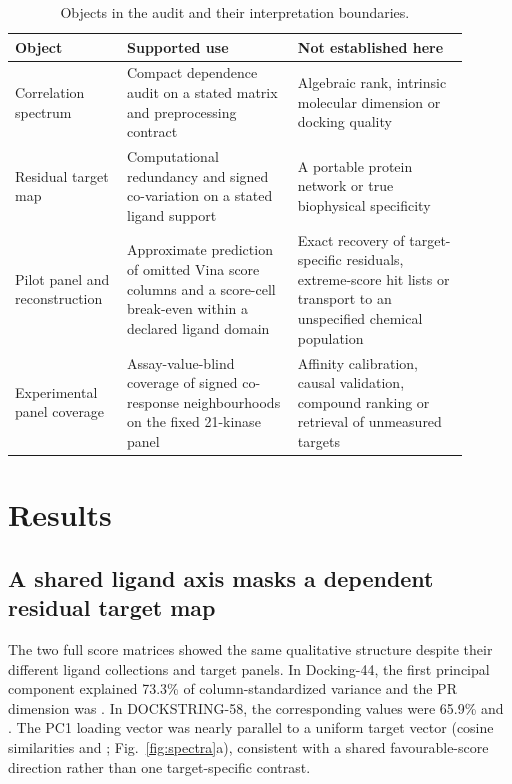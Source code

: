 \documentclass[11pt]{article}
\begin{document}
\begin{table}[htbp]
\centering
\caption{Objects in the audit and their interpretation boundaries.}
\label{tab:scope}
\small
\begin{tabular}{p{0.22\linewidth}p{0.34\linewidth}p{0.34\linewidth}}
\toprule
Object & Supported use & Not established here \\
\midrule
Correlation spectrum & Compact dependence audit on a stated matrix and
preprocessing contract & Algebraic rank, intrinsic molecular dimension or
docking quality \\
Residual target map & Computational redundancy and signed co-variation on a
stated ligand support & A portable protein network or true biophysical
specificity \\
Pilot panel and reconstruction & Approximate prediction of omitted Vina score
columns and a score-cell break-even within a declared ligand domain & Exact
recovery of target-specific residuals, extreme-score hit lists or transport to
an unspecified chemical population \\
Experimental panel coverage & Assay-value-blind coverage of signed co-response
neighbourhoods on the fixed 21-kinase panel & Affinity calibration, causal
validation, compound ranking or retrieval of unmeasured targets \\
\bottomrule
\end{tabular}
\end{table}



\section{Results}

\subsection{A shared ligand axis masks a dependent residual target map}

The two full score matrices showed the same qualitative structure despite their
different ligand collections and target panels. In Docking-44, the first
principal component explained 73.3\% of column-standardized variance and the PR
dimension was \DffRawPR{}. In DOCKSTRING-58, the corresponding values were
65.9\% and \DsRawPR{}. The PC1 loading vector was nearly parallel to a uniform
target vector (cosine similarities \DffAxisCosine{} and \DsAxisCosine{};
Fig.~\ref{fig:spectra}a), consistent with a shared favourable-score direction
rather than one target-specific contrast.
\end{document}
